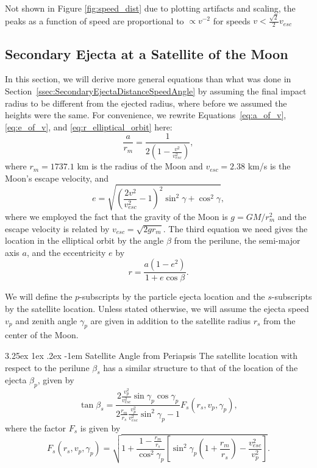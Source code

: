 \documentclass{hitec}
\makeatletter
\numberwithin{equation}{section}
\renewcommand\paragraph{\@startsection{paragraph}{5}{\z@}%
	{3.25ex \@plus1ex \@minus.2ex}%
	{-1em}%
	{\normalfont\normalsize\bfseries}}
\makeatother
\begin{document}
Not shown in Figure \ref{fig:speed_dist} due to plotting artifacts and scaling, the peaks as a function of speed are proportional to $\propto v^{-2}$ for speeds $v < \frac{\sqrt{2}}{2}v_{esc}$





\subsection{Secondary Ejecta at a Satellite of the Moon}
\label{ssec:SecondaryEjectaAtASatelliteOfTheMoon}

In this section, we will derive more general equations than what was done in Section~\ref{ssec:SecondaryEjectaDistanceSpeedAngle} by assuming the final impact radius to be different from the ejected radius, where before we assumed the heights were the same. For convenience, we rewrite Equations~\eqref{eq:a_of_v}, \eqref{eq:e_of_v}, and \eqref{eq:r_elliptical_orbit} here:
\begin{equation}\label{eq:a_of_v-repeat}
\frac{a}{r_m} = \frac{1}{2\left(1-\frac{v^2}{v_{esc}^2}\right)},
\end{equation}
where $r_m = 1737.1$ km is the radius of the Moon and $v_{esc} = 2.38$ km/s is the Moon's escape velocity, and
\begin{equation}\label{eq:e_of_v-repeat}
e = \sqrt{\left(\frac{2v^2}{v_{esc}^2}-1\right)^2\sin^2\gamma + \cos^2\gamma},
\end{equation}
where we employed the fact that the gravity of the Moon is $g = GM/r_m^2$ and the escape velocity is related by $v_{esc} = \sqrt{2gr_m}$. The third equation we need gives the location in the elliptical orbit by the angle $\beta$ from the perilune, the semi-major axis $a$, and the eccentricity $e$ by
\begin{equation}\label{eq:r_elliptical_orbit-repeat}
r = \frac{a(1-e^2)}{1+e\cos\beta}.
\end{equation}

We will define the $p$-subscripts by the particle ejecta location and the $s$-subscripts by the satellite location. Unless stated otherwise, we will assume the ejecta speed $v_p$ and zenith angle $\gamma_p$ are given in addition to the satellite radius $r_s$ from the center of the Moon.

\paragraph{Satellite Angle from Periapsis}
The satellite location with respect to the perilune $\beta_s$ has a similar structure to that of the location of the ejecta $\beta_p$, given by
\begin{equation}\label{eq:Satellite Angle from Periapsis}
\tan\beta_s = \frac{2\frac{v_p^2}{v_{esc}^2}\sin\gamma_p\cos\gamma_p}{2\frac{r_m}{r_s}\frac{v_p^2}{v_{esc}^2}\sin^2\gamma_p-1}F_s(r_s,v_p,\gamma_p),
\end{equation}
where the factor $F_s$ is given by
\begin{equation}
F_s(r_s,v_p,\gamma_p) = \sqrt{1 + \frac{1-\frac{r_m}{r_s}}{\cos^2\gamma_p}\left[\sin^2\gamma_p\left(1+\frac{r_m}{r_s}\right)-\frac{v_{esc}^2}{v_p^2}\right]}.
\end{equation}
\end{document}

